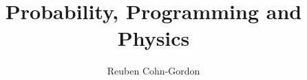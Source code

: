 \documentclass[aspectratio=169,11pt]{beamer}
\title{Probability, Programming and Physics}
\author{Reuben Cohn-Gordon}
\institute{Postdoctoral Research Scientist, UC Berkeley}
\date{}
\begin{document}
\begin{frame}[plain]
  \titlepage
\end{frame}






\end{document}
